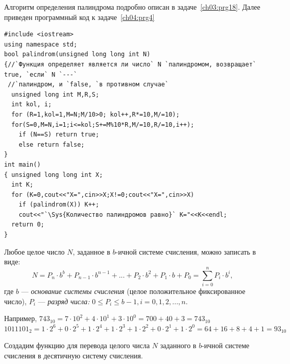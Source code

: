 
Алгоритм определения палиндрома подробно описан в задаче~\ref{ch03:prg18}. 
Далее приведен программный код к задаче~\ref{ch04:prg4}

\begin{lstlisting}
#include <iostream>
using namespace std;
bool palindrom(unsigned long long int N)
{//`Функция определяет является ли число` N `палиндромом, возвращает` true, `если` N `---`
 //`палиндром, и `false, `в противном случае`
  unsigned long int M,R,S; 
  int kol, i;
  for (R=1,kol=1,M=N;M/10>0; kol++,R*=10,M/=10);
  for(S=0,M=N,i=1;i<=kol;S+=M%10*R,M/=10,R/=10,i++);
    if (N==S) return true;
    else return false;
}
int main()
{ unsigned long long int X;
  int K;
  for (K=0,cout<<"X=",cin>>X;X!=0;cout<<"X=",cin>>X)
    if (palindrom(X)) K++;
    cout<<"`\Sys{Количество палиндромов равно}` K="<<K<<endl;
  return 0;
}
\end{lstlisting}


Любое целое число $N$, заданное в $b$-ичной системе счисления, можно записать в 
виде: 
\begin{equation*}
N=P_n\cdot b^b+P_{n-1}\cdot b^{n-1}+...+P_2\cdot b^2+P_1\cdot b+P_0=\sum_{i=0}^n{P_i\cdot b^i},
\end{equation*}
где $b$ --- \emph{основание системы счисления} (целое положительное фиксированное число), 
$P_i$  --- \emph{разряд числа:} 
$0\leqslant P_i\leqslant b-1,i=0,1,2,...,n.$

Например,
$743_{10}=7\cdot 10^{2}+4\cdot 10^{1}+3\cdot 10^{0}=700+40+3=743_{10}$
$1011101_{2}=1\cdot 2^{6}+0\cdot 2^{5}+1\cdot 2^{4}+1\cdot 2^{3}+1\cdot 2^{2}+0\cdot 2^{1}+1\cdot
2^{0}=64+16+8+4+1=93_{10}$

Создадим функцию для перевода целого числа $N$ заданного в
$b$-ичной системе счисления в десятичную систему счисления.

